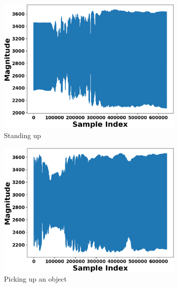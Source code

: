 \documentclass{l4proj}
\begin{document}
\begin{appendices}
\begin{figure}[h]
    \hfill
    \begin{subfigure}[b]{0.32\textwidth}
        \includegraphics[width=\textwidth]{images/raw_data3.png}
        \caption{Standing up}
        \label{fig:raw_data3}
    \end{subfigure}
    \hfill
    \begin{subfigure}[b]{0.32\textwidth}
        \includegraphics[width=\textwidth]{images/raw_data4.png}
        \caption{Picking up an object}
        \label{fig:raw_data4}
    \end{subfigure}
    \hfill
    \begin{subfigure}[b]{0.32\textwidth}

\end{subfigure}
\end{figure}
\end{appendices}
\end{document}

